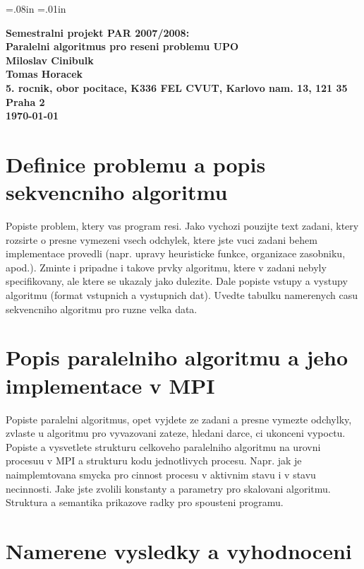  \oddsidemargin=-5mm
\evensidemargin=-5mm\marginparwidth=.08in \marginparsep=.01in
\marginparpush=5pt\topmargin=-15mm\headheight=12pt
\headsep=25pt\footheight=12pt \footskip=30pt\textheight=25cm
\textwidth=17cm\columnsep=2mm
\columnseprule=1pt\parindent=15pt\parskip=2pt


\begin{center}
\bf Semestralni projekt PAR 2007/2008:\\[5mm]
    Paralelni algoritmus pro reseni problemu UPO\\[5mm] 
       Miloslav Cinibulk\\
       Tomas Horacek\\[2mm]
5. rocnik, obor pocitace, K336 FEL CVUT, Karlovo nam. 13, 121 35 Praha 2\\[2mm]
\today
\end{center}

\section{Definice problemu a popis sekvencniho algoritmu}

Popiste problem, ktery vas program resi. Jako vychozi pouzijte text
zadani, ktery rozsirte o presne vymezeni vsech odchylek, ktere jste
vuci zadani behem implementace provedli 
(napr.  upravy heuristicke funkce, organizace zasobniku,
apod.). Zminte i pripadne i takove prvky algoritmu, ktere v zadani
nebyly specifikovany, ale ktere se ukazaly jako dulezite.  Dale
popiste vstupy a vystupy algoritmu (format vstupnich a vystupnich
dat). Uvedte tabulku namerenych casu sekvencniho algoritmu pro ruzne
velka data.

\section{Popis paralelniho algoritmu a jeho implementace v MPI}

Popiste paralelni algoritmus, opet vyjdete ze zadani a presne vymezte
odchylky, zvlaste u algoritmu pro vyvazovani zateze, hledani darce, ci
ukonceni vypoctu.  Popiste a vysvetlete strukturu celkoveho
paralelniho algoritmu na urovni procesuu v MPI a strukturu kodu
jednotlivych procesu. Napr. jak je naimplemtovana smycka pro cinnost
procesu v aktivnim stavu i v stavu necinnosti. Jake jste zvolili
konstanty a parametry pro skalovani algoritmu. Struktura a semantika
prikazove radky pro spousteni programu.

\section{Namerene vysledky a vyhodnoceni}

